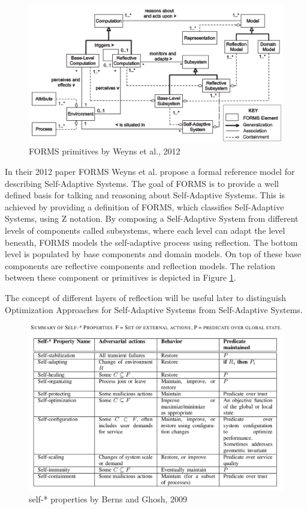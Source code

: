 \begin{figure}[b!]
    \centering
    \includegraphics[width=\textwidth]{images/FORMS.png}
    \caption{FORMS primitives by Weyns et al., 2012 \cite*{FORMS}}
    \label{fig:FORMS}
\end{figure}
In their 2012 paper FORMS \cite{FORMS} Weyns et al. propose a formal reference model for describing Self-Adaptive Systems.
The goal of FORMS is to provide a well defined basis for talking and reasoning about Self-Adaptive Systems.
This is achieved by providing a definition of FORMS, which classifies Self-Adaptive Systems, using Z notation.
By composing a Self-Adaptive System from different levels of components called subsystems,
where each level can adapt the level beneath, FORMS models the self-adaptive process using reflection.
The bottom level is populated by base components and domain models.
On top of these base components are reflective components and reflection models.
The relation between these component or primitives is depicted in Figure \ref{fig:FORMS}.
\newline
\par


The concept of different layers of reflection will be useful later to distinguish
Optimization Approaches for Self-Adaptive Systems from Self-Adaptive Systems.

\newpage
\begin{figure}[t!]
    \includegraphics[width=\textwidth]{images/SelfProperties.png}
    \caption{self-* properties by Berns and Ghosh, 2009 \cite*{DissectingSelfProperties}}
    \label{fig:SelfProperties}
\end{figure}


